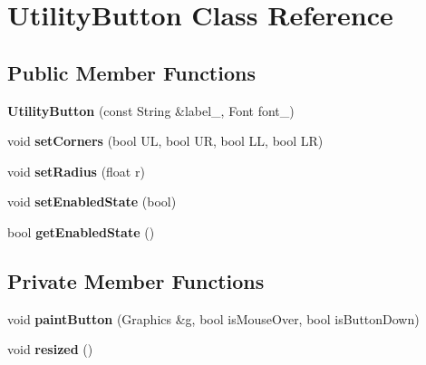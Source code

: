 \hypertarget{classUtilityButton}{\section{Utility\-Button Class Reference}
\label{classUtilityButton}
}
\subsection*{Public Member Functions}
\begin{DoxyCompactItemize}
\item 
\hypertarget{classUtilityButton_a5eefdacd94ea6636c1671bd30268ae76}{{\bfseries Utility\-Button} (const String \&label\-\_\-, Font font\-\_\-)}\label{classUtilityButton_a5eefdacd94ea6636c1671bd30268ae76}

\item 
\hypertarget{classUtilityButton_adae51ec7dbb328f92aeee30d0b96ea80}{void {\bfseries set\-Corners} (bool U\-L, bool U\-R, bool L\-L, bool L\-R)}\label{classUtilityButton_adae51ec7dbb328f92aeee30d0b96ea80}

\item 
\hypertarget{classUtilityButton_aa703482b887e1f8d4b123cf11549619a}{void {\bfseries set\-Radius} (float r)}\label{classUtilityButton_aa703482b887e1f8d4b123cf11549619a}

\item 
\hypertarget{classUtilityButton_a81ac09396e3475f7d3ec20299b1ba445}{void {\bfseries set\-Enabled\-State} (bool)}\label{classUtilityButton_a81ac09396e3475f7d3ec20299b1ba445}

\item 
\hypertarget{classUtilityButton_a247a7d048da7deb4f4b8537f1cce05e4}{bool {\bfseries get\-Enabled\-State} ()}\label{classUtilityButton_a247a7d048da7deb4f4b8537f1cce05e4}

\end{DoxyCompactItemize}
\subsection*{Private Member Functions}
\begin{DoxyCompactItemize}
\item 
\hypertarget{classUtilityButton_aaa24c18aee5f1df3ee10277a8f558f3a}{void {\bfseries paint\-Button} (Graphics \&g, bool is\-Mouse\-Over, bool is\-Button\-Down)}\label{classUtilityButton_aaa24c18aee5f1df3ee10277a8f558f3a}

\item 
\hypertarget{classUtilityButton_ac08e08174673146fddc257f3bc5972d1}{void {\bfseries resized} ()}\label{classUtilityButton_ac08e08174673146fddc257f3bc5972d1}

\end{DoxyCompactItemize}
